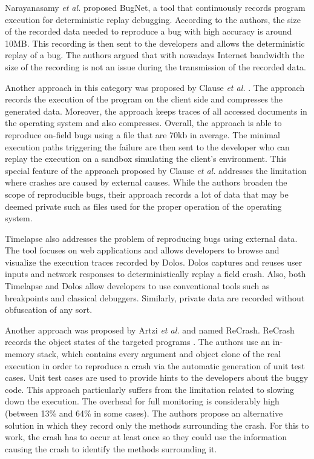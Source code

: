 \documentclass[times, doublespace]{smrauth}
\begin{document}
Narayanasamy {\it et al.} \cite{Narayanasamy2005} proposed BugNet, a tool that continuously records program execution for deterministic replay debugging. According to the authors, the size of the recorded data needed to reproduce a bug with high accuracy is around 10MB. This recording is then sent to the developers and allows the deterministic replay of a bug. The authors argued that with nowadays Internet bandwidth the size of the recording is not an issue during the transmission of the recorded data.

Another approach in this category was  proposed by Clause {\it et al.} \cite{Clause2007}. The approach records the execution of the program on the client side and compresses the generated data. Moreover, the approach keeps traces of all accessed documents in the operating system and also compresses.
Overall, the approach is able to reproduce on-field bugs using a file that are 70kb in average.
The minimal execution paths triggering the failure are then sent to the developer who can replay the execution on a sandbox simulating the client's environment.
This special feature of the approach proposed by Clause {\it et al.} addresses the limitation where crashes are caused by external causes. While the authors broaden the scope of reproducible bugs, their approach records a lot of data that may be deemed private such as files used for the proper operation of the operating system.

Timelapse \cite{Burg2013} also addresses the problem of reproducing bugs using external data. The tool focuses on web applications and allows developers to browse and visualize the execution traces recorded by Dolos. Dolos captures and reuses user inputs and network responses to deterministically replay a field crash. Also, both Timelapse and Dolos allow developers to use conventional tools such as breakpoints and classical debuggers. Similarly, private data are recorded without obfuscation of any sort.

Another approach was proposed by Artzi {\it et al.} and named ReCrash. ReCrash records the object states of the targeted programs \cite{Artzi2008}. The authors use an in-memory stack, which contains every argument and object clone of the real execution in order to reproduce a crash via the automatic generation of unit test cases.
Unit test cases are used to provide hints to the developers about the buggy code.
This approach particularly suffers from the limitation related to slowing down the execution.
The overhead for full monitoring is considerably high (between 13\% and 64\% in some cases).
The authors  propose an alternative solution in which they record only the methods surrounding the crash. For this to work, the crash has to occur at least once so they could use the information causing the crash to identify the methods surrounding it.
\end{document}
